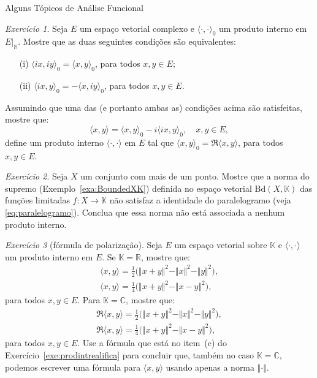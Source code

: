 \documentclass[oneside,final,11pt]{amsbook}
\newcommand{\R}{\mathds R}
\newcommand{\C}{\mathds C}
\newcommand{\K}{\mathds K}
\newcommand{\Bounded}{\mathrm{Bd}}
\theoremstyle{remark}\newtheorem{exercise}{Exercício}[chapter]
\theoremstyle{remark}\newtheorem{*exercise}[exercise]{\hbox to 0pt{\hskip 0pt minus 1fil*}Exercício}
\theoremstyle{definition}\newtheorem{exdefin}{Definição}[chapter]
\theoremstyle{plain}\newtheorem{teo}{Teorema}[section]
\theoremstyle{plain}\newtheorem{lem}[teo]{Lema}
\theoremstyle{plain}\newtheorem{prop}[teo]{Proposição}
\theoremstyle{plain}\newtheorem{cor}[teo]{Corolário}
\theoremstyle{definition}\newtheorem{defin}[teo]{Definição}
\theoremstyle{remark}\newtheorem{rem}[teo]{Observação}
\theoremstyle{definition}\newtheorem{notation}[teo]{Notação}
\theoremstyle{definition}\newtheorem{convention}[teo]{Convenção}
\theoremstyle{definition}\newtheorem{example}[teo]{Exemplo}
\numberwithin{section}{chapter}
\numberwithin{equation}{section}
\begin{document}
\begin{chapter}{Alguns Tópicos de Análise Funcional}
\begin{exercise}\label{exe:langleranglezero}
Seja $E$ um espaço vetorial complexo e $\langle\cdot,\cdot\rangle_0$ um produto interno em $E\vert_\R$.
Mostre que as duas seguintes condições são equivalentes:
\begin{itemize}
\item[(i)] $\langle ix,iy\rangle_0=\langle x,y\rangle_0$, para todos $x,y\in E$;
\item[(ii)] $\langle ix,y\rangle_0=-\langle x,iy\rangle_0$, para todos $x,y\in E$.
\end{itemize}
Assumindo que uma das (e portanto ambas as) condições acima são satisfeitas, mostre que:
\[\langle x,y\rangle=\langle x,y\rangle_0-i\langle ix,y\rangle_0,\quad x,y\in E,\]
define um produto interno $\langle\cdot,\cdot\rangle$ em $E$ tal que
$\langle x,y\rangle_0=\Re\langle x,y\rangle$, para todos $x,y\in E$.
\end{exercise}

\begin{exercise}\label{exe:supparalelogramo}
Seja $X$ um conjunto com mais de um ponto. Mostre que a norma do supremo (Exemplo~\ref{exa:BoundedXK})
definida no espaço vetorial $\Bounded(X,\K)$
das funções limitadas $f:X\to\K$ não satisfaz a identidade do paralelogramo (veja \eqref{eq:paralelogramo}).
Conclua que essa norma não está associada a nenhum produto interno.
\end{exercise}

\begin{exercise}[fórmula de polarização]
Seja $E$ um espaço vetorial sobre $\K$ e $\langle\cdot,\cdot\rangle$ um produto interno em $E$. Se $\K=\R$,
mostre que:
\begin{gather}
\label{eq:polarizacao}\langle x,y\rangle=\frac12\big(\Vert x+y\Vert^2-\Vert x\Vert^2-\Vert y\Vert^2\big),\\
\langle x,y\rangle=\frac14\big(\Vert x+y\Vert^2-\Vert x-y\Vert^2\big),
\end{gather}
para todos $x,y\in E$. Para $\K=\C$, mostre que:
\begin{gather*}
\Re\langle x,y\rangle=\frac12\big(\Vert x+y\Vert^2-\Vert x\Vert^2-\Vert y\Vert^2\big),\\
\Re\langle x,y\rangle=\frac14\big(\Vert x+y\Vert^2-\Vert x-y\Vert^2\big),
\end{gather*}
para todos $x,y\in E$. Use a fórmula que está no item~(c) do Exercício~\ref{exe:prodintrealifica} para
concluir que, também no caso $\K=\C$, podemos escrever uma fórmula para $\langle x,y\rangle$ usando
apenas a norma $\Vert\cdot\Vert$.
\end{exercise}


\end{chapter}
\end{document}

